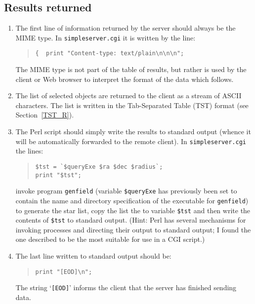 \documentclass[twoside,11pt,nolof,chapters]{starlink}
\begin{document}
\subsection{Results returned}

\begin{enumerate}

  \item The first line of information returned by the server should
   always be the MIME type.  In \texttt{simpleserver.cgi} it is written by
   the line:

  \begin{quote}
   \verb+{  print "Content-type: text/plain\n\n\n";+
  \end{quote}

   The MIME type is not part of the table of results, but rather is
   used by the client or Web browser to interpret the format of the data
   which follows.

  \item The list of selected objects are returned to the client as a
   stream of ASCII characters.  The list is written in the Tab-Separated
   Table (TST) format (see Section~\ref{TST_R}).

  \item The Perl script should simply write the results to standard
   output (whence it will be automatically forwarded to the remote
   client).  In \texttt{simpleserver.cgi} the lines:

  \begin{quote}
   \verb-$tst = `$queryExe $ra $dec $radius`;- \\
   \verb-print "$tst";-
  \end{quote}

   invoke program \texttt{genfield} (variable \verb-$queryExe- has
   previously been set to contain the name and directory specification
   of the executable for \texttt{genfield}) to generate the star list,
   copy the list the to variable \verb-$tst- and then write the contents
   of \verb-$tst- to standard output.  (Hint: Perl has several mechanisms
   for invoking processes and directing their output to standard output;
   I found the one described to be the most suitable for use in a CGI
   script.)

  \item The last line written to standard output should be:

  \begin{quote}
   \verb-print "[EOD]\n";-
  \end{quote}

   The string `\texttt{[EOD]}' informs the client that the server has
   finished sending data.

\end{enumerate}
\end{document}
